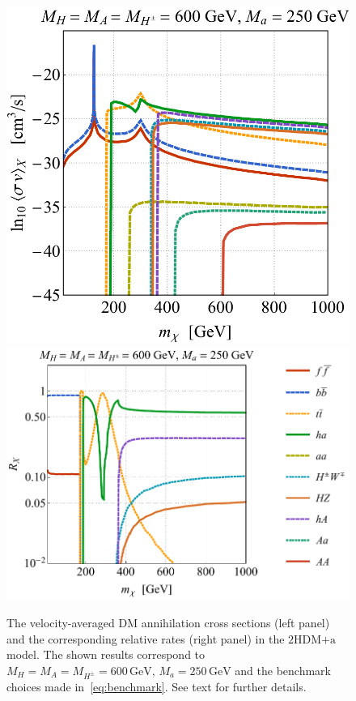 \documentclass[review]{elsarticle}
\newcommand{\hdma}{\ensuremath{\textrm{2HDM+a}}\xspace}
\begin{document}
\begin{figure}[t!]
\centering
\includegraphics[height=0.4\textwidth]{IDbenchmark.pdf} \quad 
\includegraphics[height=0.4\textwidth]{addIDbenchmark.pdf}
\vspace{4mm}
\caption{The velocity-averaged DM annihilation cross sections  (left panel) and the corresponding relative rates (right panel) in the \hdma model. The shown results correspond to $M_H = M_A = M_{H^\pm} = 600 \, {\mathrm{GeV}}$, $M_a = 250 \, {\mathrm{GeV}}$ and the benchmark choices made in~\eqref{eq:benchmark}. See text for further details. }
\label{fig:IDbenchmark}
\end{figure}
\end{document}
